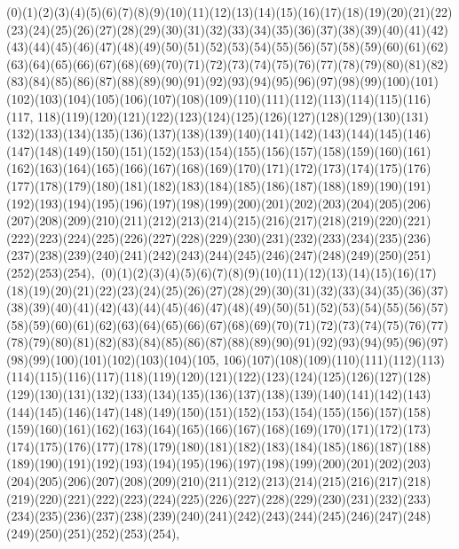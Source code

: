 \documentclass[12pt]{article}
\begin{document}
{(0)(1)(2)(3)(4)(5)(6)(7)(8)(9)(10)(11)(12)(13)(14)(15)(16)(17)(18)(19)(20)(21)(22)(23)(24)(25)(26)(27)(28)(29)(30)(31)(32)(33)(34)(35)(36)(37)(38)(39)(40)(41)(42)(43)(44)(45)(46)(47)(48)(49)(50)(51)(52)(53)(54)(55)(56)(57)(58)(59)(60)(61)(62)(63)(64)(65)(66)(67)(68)(69)(70)(71)(72)(73)(74)(75)(76)(77)(78)(79)(80)(81)(82)(83)(84)(85)(86)(87)(88)(89)(90)(91)(92)(93)(94)(95)(96)(97)(98)(99)(100)(101)(102)(103)(104)(105)(106)(107)(108)(109)(110)(111)(112)(113)(114)(115)(116)(117, 118)(119)(120)(121)(122)(123)(124)(125)(126)(127)(128)(129)(130)(131)(132)(133)(134)(135)(136)(137)(138)(139)(140)(141)(142)(143)(144)(145)(146)(147)(148)(149)(150)(151)(152)(153)(154)(155)(156)(157)(158)(159)(160)(161)(162)(163)(164)(165)(166)(167)(168)(169)(170)(171)(172)(173)(174)(175)(176)(177)(178)(179)(180)(181)(182)(183)(184)(185)(186)(187)(188)(189)(190)(191)(192)(193)(194)(195)(196)(197)(198)(199)(200)(201)(202)(203)(204)(205)(206)(207)(208)(209)(210)(211)(212)(213)(214)(215)(216)(217)(218)(219)(220)(221)(222)(223)(224)(225)(226)(227)(228)(229)(230)(231)(232)(233)(234)(235)(236)(237)(238)(239)(240)(241)(242)(243)(244)(245)(246)(247)(248)(249)(250)(251)(252)(253)(254)$
, 
$
(0)(1)(2)(3)(4)(5)(6)(7)(8)(9)(10)(11)(12)(13)(14)(15)(16)(17)(18)(19)(20)(21)(22)(23)(24)(25)(26)(27)(28)(29)(30)(31)(32)(33)(34)(35)(36)(37)(38)(39)(40)(41)(42)(43)(44)(45)(46)(47)(48)(49)(50)(51)(52)(53)(54)(55)(56)(57)(58)(59)(60)(61)(62)(63)(64)(65)(66)(67)(68)(69)(70)(71)(72)(73)(74)(75)(76)(77)(78)(79)(80)(81)(82)(83)(84)(85)(86)(87)(88)(89)(90)(91)(92)(93)(94)(95)(96)(97)(98)(99)(100)(101)(102)(103)(104)(105, 106)(107)(108)(109)(110)(111)(112)(113)(114)(115)(116)(117)(118)(119)(120)(121)(122)(123)(124)(125)(126)(127)(128)(129)(130)(131)(132)(133)(134)(135)(136)(137)(138)(139)(140)(141)(142)(143)(144)(145)(146)(147)(148)(149)(150)(151)(152)(153)(154)(155)(156)(157)(158)(159)(160)(161)(162)(163)(164)(165)(166)(167)(168)(169)(170)(171)(172)(173)(174)(175)(176)(177)(178)(179)(180)(181)(182)(183)(184)(185)(186)(187)(188)(189)(190)(191)(192)(193)(194)(195)(196)(197)(198)(199)(200)(201)(202)(203)(204)(205)(206)(207)(208)(209)(210)(211)(212)(213)(214)(215)(216)(217)(218)(219)(220)(221)(222)(223)(224)(225)(226)(227)(228)(229)(230)(231)(232)(233)(234)(235)(236)(237)(238)(239)(240)(241)(242)(243)(244)(245)(246)(247)(248)(249)(250)(251)(252)(253)(254)$
, 
$
}
\end{document}
